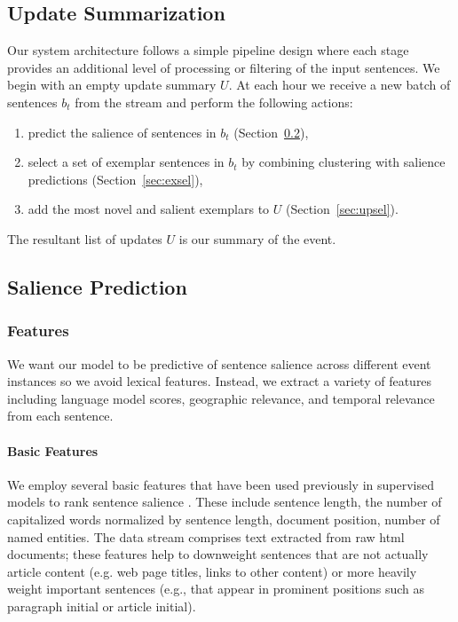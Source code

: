\subsection{Update Summarization}

Our system architecture follows a simple pipeline design where each
stage provides an additional level of processing or filtering of the input
sentences.
We begin with an empty update summary $U$.
At each hour we receive a new batch of sentences $b_t$ from the stream
and perform the following actions:
\begin{enumerate}
  \item predict the salience of sentences in $b_t$ (Section~\ref{sec:salpred}),
  \item select a set of exemplar sentences in $b_t$ by combining 
      clustering with 
      salience predictions (Section~\ref{sec:exsel}),
  \item add the most novel and salient exemplars 
      to $U$ (Section~\ref{sec:upsel}).
\end{enumerate}
The resultant list of updates $U$ is our summary of the event.


\subsection{Salience Prediction}
\label{sec:salpred}

%

\subsubsection{Features}
\label{sec:features}
We want our model to be predictive of sentence salience across different event instances so we avoid lexical features.  Instead, we extract a variety of features including language model scores, geographic relevance, and temporal relevance from each sentence.  

\paragraph{Basic Features}
We employ several basic features that have been used previously in supervised models to rank sentence salience \cite{kupiec1995trainable,conroy2001using}. These include sentence length, the number of capitalized words normalized by sentence length, document position, number of named entities.  
The data stream comprises text extracted from raw html documents;
these features help to downweight sentences that are not actually article 
content (e.g. web page titles, links to other content) or
more heavily weight important sentences (e.g., that appear in
prominent positions such as paragraph initial or article initial).

